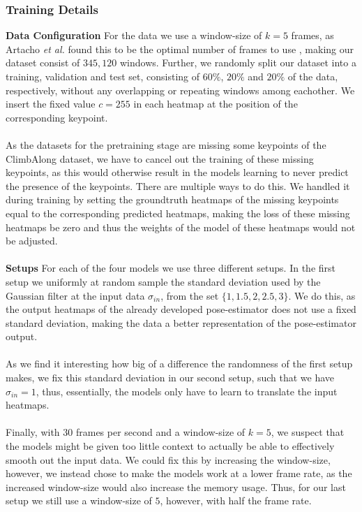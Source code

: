 \documentclass[./main.tex]{subfiles}
\begin{document}
\subsubsection{Training Details}
\textbf{Data Configuration} For the data we use a window-size of $k = 5$ frames, as Artacho \textit{et al.} found this to be the optimal number of frames to use \cite{https://doi.org/10.48550/arxiv.2001.08095}, making our dataset consist of $345,120$ windows. Further, we randomly split our dataset into a training, validation and test set, consisting of $60\%$, $20\%$ and $20\%$ of the data, respectively, without any overlapping or repeating windows among eachother. We insert the fixed value $c = 255$ in each heatmap at the position of the corresponding keypoint. 
\\
\\
As the datasets for the pretraining stage are missing some keypoints of the ClimbAlong dataset, we have to cancel out the training of these missing keypoints, as this would otherwise result in the models learning to never predict the presence of the keypoints. There are multiple ways to do this. We handled it during training by setting the groundtruth heatmaps of the missing keypoints equal to the corresponding predicted heatmaps, making the loss of these missing heatmaps be zero and thus the weights of the model of these heatmaps would not be adjusted. 
\\
\\
\textbf{Setups} For each of the four models we use three different setups. In the first setup we uniformly at random sample the standard deviation used by the Gaussian filter at the input data $\sigma_{in}$, from the set $\{1, 1.5, 2, 2.5, 3\}$. We do this, as the output heatmaps of the already developed pose-estimator does not use a fixed standard deviation, making the data a better representation of the pose-estimator output. 
\\
\\
As we find it interesting how big of a difference the randomness of the first setup makes, we fix this standard deviation in our second setup, such that we have $\sigma_{in} = 1$, thus, essentially, the models only have to learn to translate the input heatmaps.
\\
\\
Finally, with $30$ frames per second and a window-size of $k = 5$, we suspect that the models might be given too little context to actually be able to effectively smooth out the input data. We could fix this by increasing the window-size, however, we instead chose to make the models work at a lower frame rate, as the increased window-size would also increase the memory usage. Thus, for our last setup we still use a window-size of $5$, however, with half the frame rate. 
\end{document}
